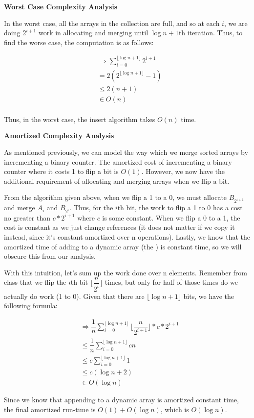 \documentclass{article}
\newcommand\floor[1]{\lfloor#1\rfloor}
\begin{document}
\newline

\textbf{Worst Case Complexity Analysis}

In the worst case, all the arrays in the collection are full, and so at each $i$, we are doing
$2^{i+1}$ work in allocating and merging until $\log n + 1$th iteration.
Thus, to find the worse case, the computation is as follows:

\begin{align*}
    & \Rightarrow \sum\limits_{i=0}^{ \floor{\log n + 1} } 2^{i+1}\\
    & = 2(2^{\floor{\log n + 1}} - 1)\\
    & \leq 2(n + 1) \\
    & \in O(n) \\
\end{align*}

Thus, in the worst case, the insert algorithm takes $O(n)$ time.
\newline

\textbf{Amortized Complexity Analysis}

As mentioned previously, we can model the way which we merge sorted arrays by incrementing a binary counter. The
amortized cost of incrementing a binary counter where it costs 1 to flip a bit is $O(1)$.
However, we now have the additional requirement of allocating and merging arrays when we flip a bit.

From the algorithm given above, when we flip a 1 to a 0, we must allocate $B_{2^{i+1}}$ and merge $A_i$ and
$B_{2^i}$. Thus, for the $i$th bit, the work to flip a 1 to 0 has a cost no greater than $c * 2^{i+1}$ where
$c$ is some constant. When we flip a 0 to a 1, the cost is constant as we just change references (it does
not matter if we copy it instead, since it's constant amortized over n operations).
Lastly, we know that the amortized time of adding to a dynamic array (the )
is constant time, so we will obscure this from our analysis.

With this intuition, let's sum up the work done over n elements. Remember from class that we flip the
$i$th bit $\floor{\dfrac{n}{2^i}}$ times, but only for half of those times do we actually do work (1 to 0).
Given that there are $\floor{\log n + 1}$ bits, we have the following formula:

\begin{align*}
    & \Rightarrow \dfrac{1}{n} \sum\limits_{i=0}^{ \floor{\log n + 1} } \floor{\dfrac{n}{2^{i+1}}} * c * 2^{i + 1} \\
    & \leq \dfrac{1}{n} \sum\limits_{i=0}^{ \floor{\log n + 1} } cn \\
    & \leq c \sum\limits_{i=0}^{ \floor{\log n + 1} } 1 \\
    & \leq  c (\log n + 2) \\
    & \in O(\log n)
\end{align*}

Since we know that appending to a dynamic array is amortized constant time, the final amortized run-time is
$O(1) + O(\log n)$, which is $O(\log n)$.
\end{document}
